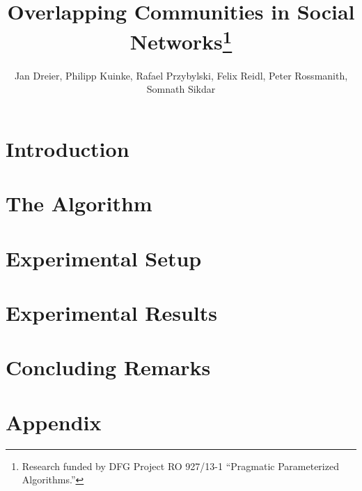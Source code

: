 \documentclass[11pt]{llncs}
\title{Overlapping Communities in Social Networks\thanks{Research 
funded by DFG Project RO 927/13-1 ``Pragmatic Parameterized Algorithms.''}}
\author{Jan Dreier, 
Philipp Kuinke, 
Rafael Przybylski,
Felix Reidl, 
Peter Rossmanith, 
Somnath Sikdar
}
\institute{Theoretical Computer Science, \\ 
RWTH Aachen University, \\
52074 Aachen Germany}
\begin{document}
\maketitle

\begin{abstract}

\end{abstract}

\section{Introduction}


\section{The Algorithm} \label{sec:algorithm}


\section{Experimental Setup} \label{sec:experiment_setup}



\section{Experimental Results}\label{sec:experiment_results}




%

\section{Concluding Remarks} \label{sec:conclusions}

\def\redefineme{
    \def\LNCS{LNCS}%
    \def\ICALP##1{Proc. of ##1 ICALP}%
    \def\FOCS##1{Proc. of ##1 FOCS}%
    \def\COCOON##1{Proc. of ##1 COCOON}%
    \def\SODA##1{Proc. of ##1 SODA}%
    \def\SWAT##1{Proc. of ##1 SWAT}%
    \def\IWPEC##1{Proc. of ##1 IWPEC}%
    \def\IWOCA##1{Proc. of ##1 IWOCA}%
    \def\ISAAC##1{Proc. of ##1 ISAAC}%
    \def\STACS##1{Proc. of ##1 STACS}%
    \def\ESA##1{Proc. of ##1 ESA}%
    \def\WG##1{Proc. of ##1 WG}%
    \def\LIPIcs##1{LIPIcs}%
    \def\LIPIcs{LIPIcs}%
    \def\LICS##1{Proc. of ##1 LICS}%
}

%



\newpage

\section*{Appendix}


\end{document}
